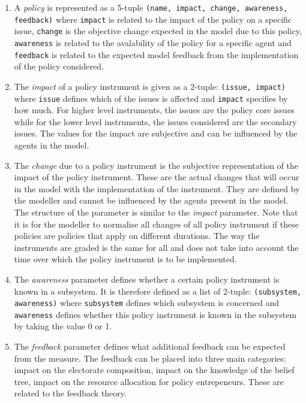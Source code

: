 \begin{enumerate}
\item A \emph{policy} is represented as a 5-tuple \texttt{(name, impact, change, awareness, feedback)} where \texttt{impact} is related to the impact of the policy on a specific issue, \texttt{change} is the objective change expected in the model due to this policy, \texttt{awareness} is related to the avalability of the policy for a specific agent and \texttt{feedback} is related to the expected model feedback from the implementation of the policy considered.

\item The \emph{impact} of a policy instrument is given as a 2-tuple: \texttt{(issue, impact)} where \texttt{issue} defines which of the issues is affected and \texttt{impact} specifies by how much. For higher level instruments, the issues are the policy core issues while for the lower level instruments, the issues considered are the secondary issues. The values for the impact are subjective and can be influenced by the agents in the model. 

\item The \emph{change} due to a policy instrument is the subjective representation of the impact of the policy instrument. These are the actual changes that will occur in the model with the implementation of the instrument. They are defined by the modeller and cannot be influenced by the agents present in the model. The structure of the parameter is similar to the \emph{impact} parameter. Note that it is for the modeller to normalise all changes of all policy instrument if these policies are policies that apply on different durations. The way the instruments are graded is the same for all and does not take into account the time over which the policy instrument is to be implemented.

\item The \emph{awareness} parameter defines whether a certain policy instrument is known in a subsystem. It is therefore defined as a list of 2-tuple: \texttt{(subsystem, awareness)} where \texttt{subsystem} defines which subsystem is concerned and \texttt{awareness} defines whether this policy instrument is known in the subsystem by taking the value 0 or 1.

\item The \emph{feedback} parameter defines what additional feedback can be expected from the measure. The feedback can be placed into three main categories: impact on the electorate composition, impact on the knowledge of the belief tree, impact on the resource allocation for policy entrepeneurs. These are related to the feedback theory.


\end{enumerate}
